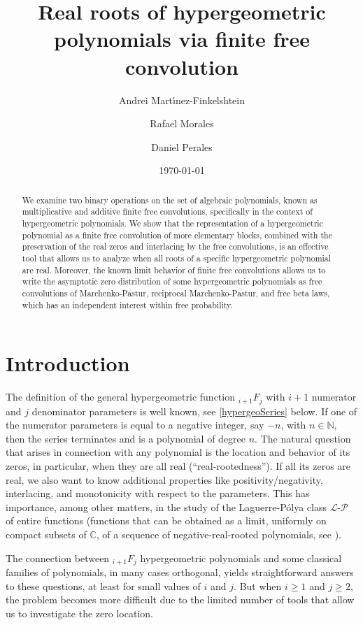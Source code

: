 \documentclass[reqno,11pt]{amsart}
\title[Finite Free Convolution of Hypergeometric polynomials]{Real roots of hypergeometric polynomials via finite free convolution}
\author[A. Mart\'{\i}nez-Finkelshtein]{Andrei Mart\'{\i}nez-Finkelshtein}
\author[R.~Morales]{Rafael Morales}
\author[D.~Perales]{Daniel Perales}
\date{\today}
\theoremstyle{remark}
\begin{document}
\begin{abstract}
We examine two binary operations on the set of algebraic polynomials, known as  multiplicative and additive finite free convolutions,  specifically in the context of hypergeometric polynomials. We show that the representation of a hypergeometric polynomial as a finite free convolution of more elementary blocks, combined with the preservation of the real zeros and interlacing by the free convolutions, is an effective tool that allows us to analyze when all roots of a specific hypergeometric polynomial are real. Moreover, the known limit behavior of finite free convolutions allows us to write the asymptotic zero distribution of some hypergeometric polynomials as free convolutions of Marchenko-Pastur, reciprocal Marchenko-Pastur, and free beta laws, which has an independent interest within free probability.
\end{abstract}

\maketitle

\tableofcontents

 

\section{Introduction}

The definition of the general hypergeometric function ${ }_{i+1} F_j$ with $i+1$ numerator and $j$ denominator parameters is well known, see 
\eqref{hypergeoSeries} below. If one of the numerator parameters is equal to a negative integer, say $ -n$, with $n \in \mathbb{N}$, then the series terminates and is a polynomial of degree $n$. The natural question that arises in connection with any polynomial is the location and behavior of its zeros, in particular, when they are all real (``real-rootedness''). If all its zeros are real, we also want to know additional properties like positivity/negativity, interlacing, and monotonicity with respect to the parameters. This has importance, among other matters, in the study of the Laguerre-Pólya class $\mathcal L$-$\mathcal P$ of entire functions (functions that can be obtained as a limit, uniformly on compact subsets of $\mathbb{C}$, of a sequence of negative-real-rooted polynomials, see \cite{MR4442978}).

The connection between ${ }_{i+1} F_j$ hypergeometric polynomials and some classical families of polynomials, in many cases orthogonal, yields straightforward answers to these questions, at least for small values of $i$ and $j$. But when $i\ge 1$ and $j\ge 2$, the problem becomes more difficult due to the limited number of tools that allow us to investigate the zero location.  
\end{document}
